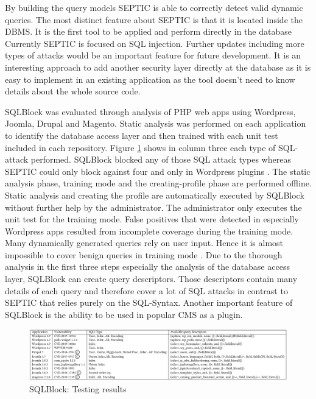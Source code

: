 By building the query models SEPTIC is able to correctly detect valid dynamic queries. The most distinct feature about SEPTIC is that it is located inside the DBMS. It is the first tool to be applied and perform directly in the database \autocite[1182f, 1186]{Medeiros2019} Currently SEPTIC is focused on SQL injection. Further updates including more types of attacks would be an important feature for future development. It is an interesting approach to add another security layer directly at the database as it is easy to implement in an existing application as the tool doesn't need to know details about the whole source code.\newline


SQLBlock was evaluated through analysis of PHP web apps using Wordpress, Joomla, Drupal and Magento. Static analysis was performed on each application to identify the database access layer and then trained with each unit test included in each repository. Figure \ref{sqlblock} shows in column three each type of SQL-attack performed. SQLBlock blocked any of those SQL attack types whereas SEPTIC could only block against four and only in Wordpress plugins \autocite[11]{Jahanshahi2018}. The static analysis phase, training mode and the creating-profile phase are performed offline. Static analysis and creating the profile are automatically executed by SQLBlock without further help by the administrator. The administrator only executes the unit test for the training mode. False positives that were detected in especially Wordpress apps resulted from incomplete coverage during the training mode. Many dynamically generated queries rely on user input. Hence it is almost impossible to cover benign queries in training mode \autocite[10-12]{Jahanshahi2018}. Due to the thorough analysis in the first three steps especially the analysis of the database access layer, SQLBlock can create query descriptors. Those descriptors contain many details of each query and therefore cover a lot of SQL attacks in contrast to SEPTIC that relies purely on the SQL-Syntax. Another important feature of SQLBlock is the ability to be used in popular CMS as a plugin.

\begin{figure}
\centering
\includegraphics[scale=0.75]{sqlblock.PNG}
\caption{SQLBlock: Testing results \autocite[12]{Jahanshahi2018}}
\label{sqlblock}
\end{figure}

